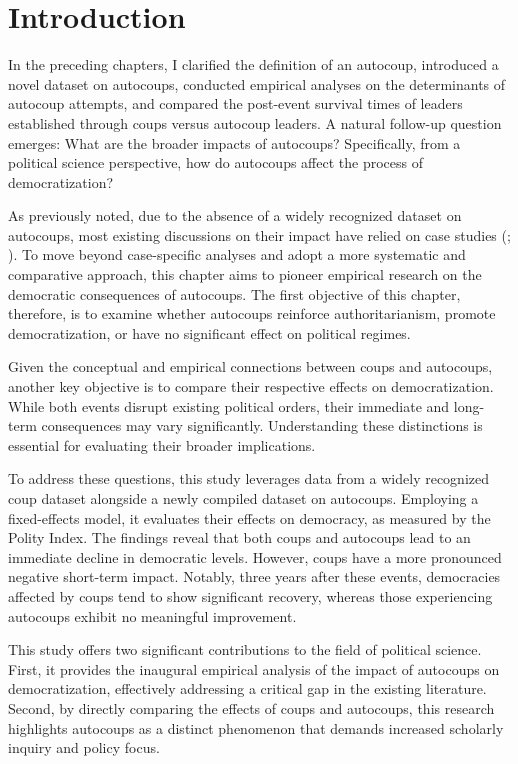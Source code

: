 \documentclass[
  12pt,
]{report}
\begin{document}
\section{Introduction}\label{introduction-4}

In the preceding chapters, I clarified the definition of an autocoup,
introduced a novel dataset on autocoups, conducted empirical analyses on
the determinants of autocoup attempts, and compared the post-event
survival times of leaders established through coups versus autocoup
leaders. A natural follow-up question emerges: What are the broader
impacts of autocoups? Specifically, from a political science
perspective, how do autocoups affect the process of democratization?

As previously noted, due to the absence of a widely recognized dataset
on autocoups, most existing discussions on their impact have relied on
case studies (;
). To move beyond
case-specific analyses and adopt a more systematic and comparative
approach, this chapter aims to pioneer empirical research on the
democratic consequences of autocoups. The first objective of this
chapter, therefore, is to examine whether autocoups reinforce
authoritarianism, promote democratization, or have no significant effect
on political regimes.

Given the conceptual and empirical connections between coups and
autocoups, another key objective is to compare their respective effects
on democratization. While both events disrupt existing political orders,
their immediate and long-term consequences may vary significantly.
Understanding these distinctions is essential for evaluating their
broader implications.

To address these questions, this study leverages data from a widely
recognized coup dataset alongside a newly compiled dataset on autocoups.
Employing a fixed-effects model, it evaluates their effects on
democracy, as measured by the Polity Index. The findings reveal that
both coups and autocoups lead to an immediate decline in democratic
levels. However, coups have a more pronounced negative short-term
impact. Notably, three years after these events, democracies affected by
coups tend to show significant recovery, whereas those experiencing
autocoups exhibit no meaningful improvement.

This study offers two significant contributions to the field of
political science. First, it provides the inaugural empirical analysis
of the impact of autocoups on democratization, effectively addressing a
critical gap in the existing literature. Second, by directly comparing
the effects of coups and autocoups, this research highlights autocoups
as a distinct phenomenon that demands increased scholarly inquiry and
policy focus.
\end{document}
